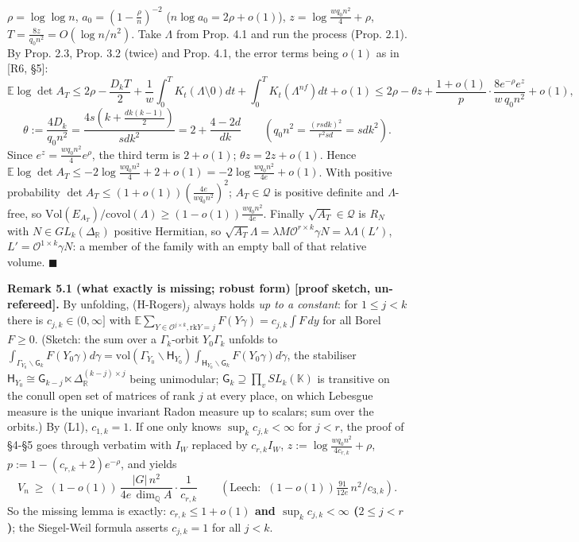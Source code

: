 \(\rho=\log\log n\), \(a_0=(1-\frac\rho n)^{-2}\) (\(n\log a_0=2\rho+o(1)\)), \(z=\log\frac{wq_0n^2}4+\rho\), \(T=\frac{8z}{q_0n^2}=O(\log n/n^2)\). Take \(\Lambda\) from Prop. 4.1 and run the process (Prop. 2.1). By Prop. 2.3, Prop. 3.2 (twice) and Prop. 4.1, the error terms being \(o(1)\) as in {[}R6, §5{]}:
\[\mathbb E\log\det A_T\le2\rho-\frac{D_kT}2+\frac1w\int_0^TK_t(\Lambda\setminus0)dt+\int_0^TK_t(\Lambda^{nf})dt+o(1)\le2\rho-\theta z+\frac{1+o(1)}{p}\cdot\frac{8e^{-\rho}e^z}{w\,q_0n^2}+o(1),\]
\[\theta:=\frac{4D_k}{q_0n^2}=\frac{4s(k+\frac{dk(k-1)}2)}{sdk^2}=2+\frac{4-2d}{dk}\qquad(q_0n^2=\tfrac{(rsdk)^2}{r^2sd}=sdk^2).\]
Since \(e^z=\frac{wq_0n^2}4e^\rho\), the third term is \(2+o(1)\); \(\theta z=2z+o(1)\). Hence \(\mathbb E\log\det A_T\le-2\log\frac{wq_0n^2}4+2+o(1)=-2\log\frac{wq_0n^2}{4e}+o(1)\). With positive probability \(\det A_T\le(1+o(1))(\frac{4e}{wq_0n^2})^2\); \(A_T\in\mathcal Q\) is positive definite and \(\Lambda\)-free, so \(\mathrm{Vol}(E_{A_T})/\mathrm{covol}(\Lambda)\ge(1-o(1))\frac{wq_0n^2}{4e}\). Finally \(\sqrt{A_T}\in\mathcal Q\) is \(R_{N}\) with \(N\in GL_k(\Delta_{\mathbb R})\) positive Hermitian, so \(\sqrt{A_T}\Lambda=\lambda M\mathcal O^{r\times k}\gamma N=\lambda\Lambda(L')\), \(L'=\mathcal O^{1\times k}\gamma N\): a member of the family with an empty ball of that relative volume. \(\blacksquare\)

\textbf{Remark 5.1 (what exactly is missing; robust form) {[}proof sketch, un-refereed{]}.} By unfolding, (H-Rogers)\(_j\) always holds \emph{up to a constant}: for \(1\le j<k\) there is \(c_{j,k}\in(0,\infty]\) with \(\mathbb E\sum_{Y\in\mathcal O^{j\times k},\mathrm{rk}Y=j}F(Y\gamma)=c_{j,k}\int F\,dy\) for all Borel \(F\ge0\). (Sketch: the sum over a \(\Gamma_k\)-orbit \(Y_0\Gamma_k\) unfolds to \(\int_{\Gamma_{Y_0}\backslash\mathsf G_k}F(Y_0\gamma)d\gamma=\mathrm{vol}(\Gamma_{Y_0}\backslash\mathsf H_{Y_0})\int_{\mathsf H_{Y_0}\backslash\mathsf G_k}F(Y_0\gamma)d\dot\gamma\), the stabiliser \(\mathsf H_{Y_0}\cong\mathsf G_{k-j}\ltimes\Delta_{\mathbb R}^{(k-j)\times j}\) being unimodular; \(\mathsf G_k\supseteq\prod_vSL_k(\mathbb K)\) is transitive on the conull open set of matrices of rank \(j\) at every place, on which Lebesgue measure is the unique invariant Radon measure up to scalars; sum over the orbits.) By (L1), \(c_{1,k}=1\). If one only knows \(\sup_kc_{j,k}<\infty\) for \(j<r\), the proof of §4-§5 goes through verbatim with \(I_W\) replaced by \(c_{r,k}I_W\), \(z:=\log\frac{wq_0n^2}{4c_{r,k}}+\rho\), \(p:=1-(c_{r,k}+2)e^{-\rho}\), and yields
\[V_n\ \ge\ (1-o(1))\,\frac{|G|\,n^2}{4e\,\dim_{\mathbb Q}A}\cdot\frac1{c_{r,k}}\qquad(\text{Leech: }\ (1-o(1))\tfrac{91}{12e}\,n^2/c_{3,k}).\]
So the missing lemma is exactly: \textbf{\(c_{r,k}\le1+o(1)\) and \(\sup_kc_{j,k}<\infty\) (\(2\le j<r\))}; the Siegel-Weil formula asserts \(c_{j,k}=1\) for all \(j<k\).

